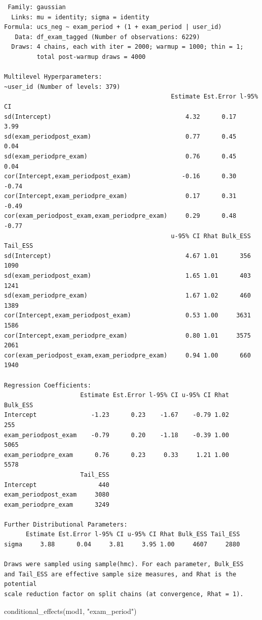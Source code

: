 \documentclass[
  11pt,
  a4paper,
  onecolumn]{article}
\newenvironment{Shaded}{}{}
\newcommand{\FunctionTok}[1]{\textcolor[rgb]{0.44,0.26,0.76}{#1}}
\newcommand{\NormalTok}[1]{\textcolor[rgb]{0.14,0.16,0.18}{#1}}
\newcommand{\StringTok}[1]{\textcolor[rgb]{0.01,0.18,0.38}{#1}}
\begin{document}
\begin{verbatim}
 Family: gaussian 
  Links: mu = identity; sigma = identity 
Formula: ucs_neg ~ exam_period + (1 + exam_period | user_id) 
   Data: df_exam_tagged (Number of observations: 6229) 
  Draws: 4 chains, each with iter = 2000; warmup = 1000; thin = 1;
         total post-warmup draws = 4000

Multilevel Hyperparameters:
~user_id (Number of levels: 379) 
                                              Estimate Est.Error l-95% CI
sd(Intercept)                                     4.32      0.17     3.99
sd(exam_periodpost_exam)                          0.77      0.45     0.04
sd(exam_periodpre_exam)                           0.76      0.45     0.04
cor(Intercept,exam_periodpost_exam)              -0.16      0.30    -0.74
cor(Intercept,exam_periodpre_exam)                0.17      0.31    -0.49
cor(exam_periodpost_exam,exam_periodpre_exam)     0.29      0.48    -0.77
                                              u-95% CI Rhat Bulk_ESS Tail_ESS
sd(Intercept)                                     4.67 1.01      356     1090
sd(exam_periodpost_exam)                          1.65 1.01      403     1241
sd(exam_periodpre_exam)                           1.67 1.02      460     1389
cor(Intercept,exam_periodpost_exam)               0.53 1.00     3631     1586
cor(Intercept,exam_periodpre_exam)                0.80 1.01     3575     2061
cor(exam_periodpost_exam,exam_periodpre_exam)     0.94 1.00      660     1940

Regression Coefficients:
                     Estimate Est.Error l-95% CI u-95% CI Rhat Bulk_ESS
Intercept               -1.23      0.23    -1.67    -0.79 1.02      255
exam_periodpost_exam    -0.79      0.20    -1.18    -0.39 1.00     5065
exam_periodpre_exam      0.76      0.23     0.33     1.21 1.00     5578
                     Tail_ESS
Intercept                 440
exam_periodpost_exam     3080
exam_periodpre_exam      3249

Further Distributional Parameters:
      Estimate Est.Error l-95% CI u-95% CI Rhat Bulk_ESS Tail_ESS
sigma     3.88      0.04     3.81     3.95 1.00     4607     2880

Draws were sampled using sample(hmc). For each parameter, Bulk_ESS
and Tail_ESS are effective sample size measures, and Rhat is the potential
scale reduction factor on split chains (at convergence, Rhat = 1).
\end{verbatim}

\begin{Shaded}
\begin{Highlighting}[]
\FunctionTok{conditional\_effects}\NormalTok{(mod1, }\StringTok{"exam\_period"}\NormalTok{)}
\end{Highlighting}
\end{Shaded}
\end{document}
